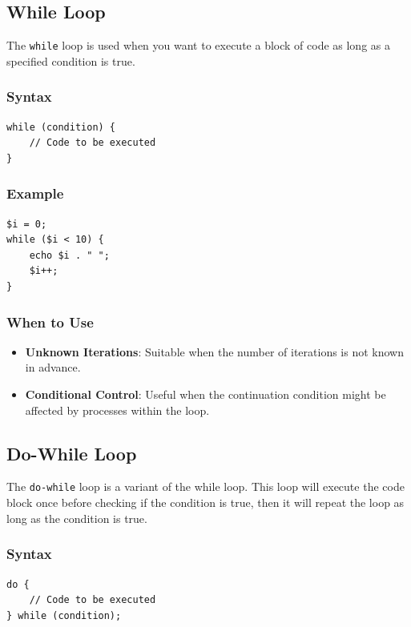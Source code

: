 \documentclass[11pt]{article}
\begin{document}
\subsection{While Loop}
\label{sec:org25c57a9}
The \texttt{while} loop is used when you want to execute a block of code as
long as a specified condition is true.

\subsubsection{Syntax}
\label{sec:org3869f47}
\begin{verbatim}
while (condition) {
    // Code to be executed
}
\end{verbatim}

\subsubsection{Example}
\label{sec:org17e8aa8}
\begin{verbatim}
$i = 0;
while ($i < 10) {
    echo $i . " ";
    $i++;
}
\end{verbatim}

\subsubsection{When to Use}
\label{sec:org721c488}
\begin{itemize}
\item \textbf{Unknown Iterations}: Suitable when the number of iterations is not
known in advance.
\item \textbf{Conditional Control}: Useful when the continuation condition might be
affected by processes within the loop.
\end{itemize}

\subsection{Do-While Loop}
\label{sec:org22f33f4}
The \texttt{do-while} loop is a variant of the while loop. This loop will
execute the code block once before checking if the condition is true,
then it will repeat the loop as long as the condition is true.

\subsubsection{Syntax}
\label{sec:orgfa2210b}
\begin{verbatim}
do {
    // Code to be executed
} while (condition);
\end{verbatim}
\end{document}
